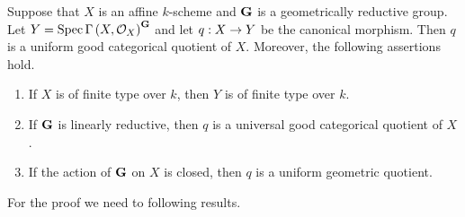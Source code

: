 \begin{theorem}\label{theorem:Mumfords_theorem_for_good_affine_quotients}
Suppose that $X$ is an affine $k$-scheme and $\mathbf{G}$ is a geometrically reductive group. Let $Y = \mathrm{Spec}\, \Gamma\left(X,{\mathcal O}_X\right)^{\mathbf{G}}$ and let $q:X\rightarrow Y$ be the canonical morphism. Then $q$ is a uniform good categorical quotient of $X$. Moreover, the following assertions hold. 
\begin{enumerate}[label=\emph{\textbf{(\arabic*)}}, leftmargin=3.0em]
\item If $X$ is of finite type over $k$, then $Y$ is of finite type over $k$.
\item If $\mathbf{G}$ is linearly reductive, then $q$ is a universal good categorical quotient of $X$.
\item If the action of $\mathbf{G}$ on $X$ is closed, then $q$ is a uniform geometric quotient.
\end{enumerate}
\end{theorem}
\noindent
For the proof we need to following results.

